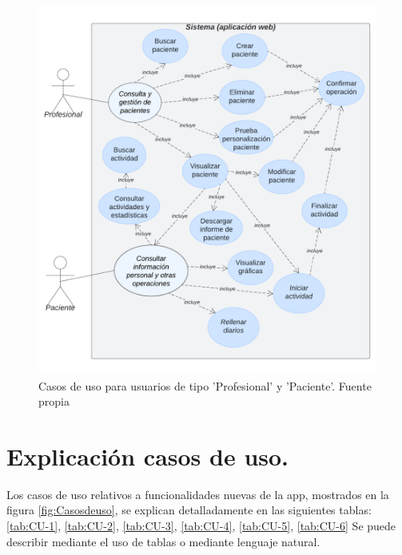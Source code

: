 \begin{figure}[h]
    \centering
    \includegraphics[width=1\textwidth]{img/casospacienteprof.png}
    \caption{Casos de uso para usuarios de tipo 'Profesional' y 'Paciente'. Fuente propia}
    \label{fig:Casospacienteprof}
\end{figure}

\section{Explicación casos de uso.}
Los casos de uso relativos a funcionalidades nuevas de la app, mostrados en la figura \ref{fig:Casosdeuso}, se explican detalladamente en las siguientes tablas: \ref{tab:CU-1}, \ref{tab:CU-2}, \ref{tab:CU-3}, \ref{tab:CU-4}, \ref{tab:CU-5}, \ref{tab:CU-6}
Se puede describir mediante el uso de tablas o mediante lenguaje natural.    

